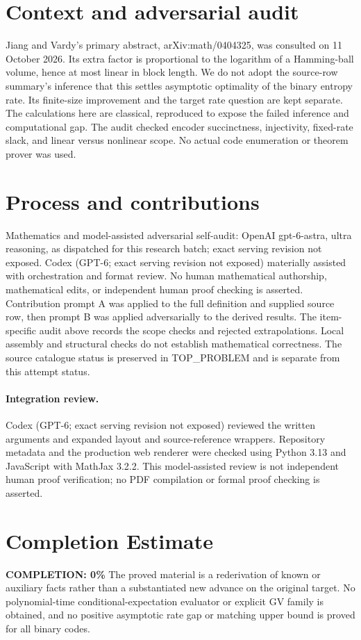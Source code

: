 \documentclass[11pt]{article}
\begin{document}
\section{Context and adversarial audit}
Jiang and Vardy's primary abstract, arXiv:math/0404325, was consulted on
11 October 2026. Its extra factor is proportional to the logarithm of a
Hamming-ball volume, hence at most linear in block length. We do not adopt
the source-row summary's inference that this settles asymptotic optimality
of the binary entropy rate. Its finite-size improvement and the target rate
question are kept separate. The calculations here are classical, reproduced
to expose the failed inference and computational gap. The audit checked
encoder succinctness, injectivity, fixed-rate slack, and linear versus
nonlinear scope. No actual code enumeration or theorem prover was used.

\section{Process and contributions}
Mathematics and model-assisted adversarial self-audit: OpenAI gpt-6-astra, ultra reasoning, as dispatched for this research batch; exact serving revision not exposed. Codex (GPT-6; exact serving revision not exposed) materially assisted with orchestration and format review. No human mathematical authorship, mathematical edits, or independent human proof checking is asserted.
Contribution prompt A was applied to the full definition and supplied source row, then prompt B was applied adversarially to the derived results. The item-specific audit above records the scope checks and rejected extrapolations. Local assembly and structural checks do not establish mathematical correctness. The source catalogue status is preserved in TOP\_PROBLEM and is separate from this attempt status.
\paragraph{Integration review.} Codex (GPT-6; exact serving revision not exposed) reviewed the written arguments and expanded layout and source-reference wrappers. Repository metadata and the production web renderer were checked using Python 3.13 and JavaScript with MathJax 3.2.2. This model-assisted review is not independent human proof verification; no PDF compilation or formal proof checking is asserted.

\section{Completion Estimate}
\noindent\textbf{COMPLETION: 0\%}
The proved material is a rederivation of known or auxiliary facts rather than a substantiated new advance on the original target. No polynomial-time conditional-expectation evaluator or explicit GV family is obtained, and no positive asymptotic rate gap or matching upper bound is proved for all binary codes.
\end{document}
